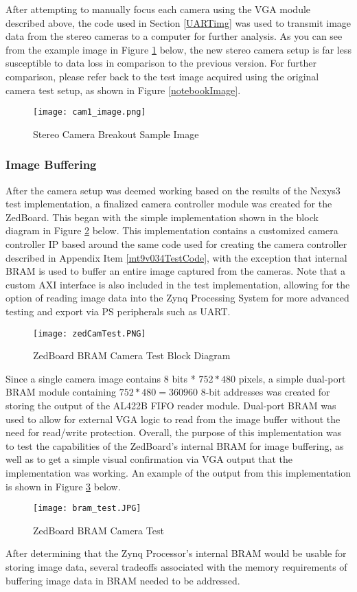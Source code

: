 \par
After attempting to manually focus each camera using the VGA module described above, the code used in Section \ref{UARTimg} was used to transmit image data from the stereo cameras to a computer for further analysis. As you can see from the example image in Figure \ref{newBoardImage} below, the new stereo camera setup is far less susceptible to data loss in comparison to the previous version. For further comparison, please refer back to the test image acquired using the original camera test setup, as shown in Figure \ref{notebookImage}.
\begin{figure}[H] 
	\centering
	\texttt{[image: cam1\_image.png]}
	\caption{Stereo Camera Breakout Sample Image}
	\label{newBoardImage}
\end{figure}

\subsubsection{Image Buffering}
After the camera setup was deemed working based on the results of the Nexys3 test implementation, a finalized camera controller module was created for the ZedBoard. This began with the simple implementation shown in the block diagram in Figure \ref{zedCamTest} below. This implementation contains a customized camera controller IP based around the same code used for creating the camera controller described in Appendix Item \ref{mt9v034TestCode}, with the exception that internal BRAM is used to buffer an entire image captured from the cameras. Note that a custom AXI interface is also included in the test implementation, allowing for the option of reading image data into the Zynq Processing System for more advanced testing and export via PS peripherals such as UART. 
\begin{figure}[H] 
	\centering
	\texttt{[image: zedCamTest.PNG]}
	\caption{ZedBoard BRAM Camera Test Block Diagram}
	\label{zedCamTest}
\end{figure}
\par
Since a single camera image contains 8 bits * $752*480$ pixels, a simple dual-port BRAM module containing $752*480=360960$ 8-bit addresses was created for storing the output of the AL422B FIFO reader module. Dual-port BRAM was used to allow for external VGA logic to read from the image buffer without the need for read/write protection. Overall, the purpose of this implementation was to test the capabilities of the ZedBoard's internal BRAM for image buffering, as well as to get a simple visual confirmation via VGA output that the implementation was working. An example of the output from this implementation is shown in Figure \ref{bramCamTest} below. 
\begin{figure}[H] 
	\centering
	\texttt{[image: bram\_test.JPG]}
	\caption{ZedBoard BRAM Camera Test}
	\label{bramCamTest}
\end{figure}
\par
After determining that the Zynq Processor's internal BRAM would be usable for storing image data, several tradeoffs associated with the memory requirements of buffering image data in BRAM needed to be addressed. 

